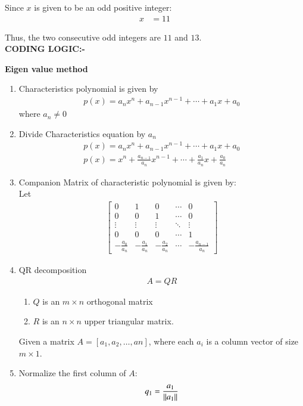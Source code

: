 \documentclass[journal]{IEEEtran}
\begin{document}
Since \( x \) is given to be an odd positive integer:
\begin{align}
x &= 11 \label{eq12}
\end{align}

Thus, the two consecutive odd integers are \( 11 \) and \( 13 \).\\



\textbf{CODING LOGIC:-}


\textbf{Eigen value method}
\begin{enumerate}
\item Characteristics polynomial is given by
\begin{align}
 p(x)=a_nx^n+a_{n-1}x^{n-1}+\cdots +a_1x+a_0   
\end{align}
where $a_n \neq 0$
\item Divide Characteristics equation by $a_n$
\begin{align}
    p(x)= a_nx^n+a_{n-1}x^{n-1}+\cdots +a_1x+a_0     \\
    p(x)=x^n+\frac{a_{n-1}}{a_n}x^{n-1}+\cdots +\frac{a_1}{a_n}x+\frac{a_0}{a_n}
\end{align}
\item Companion Matrix of characteristic polynomial is given by:\\
Let
\begin{align}
    \begin{bmatrix}
0 & 1 & 0 & \cdots & 0 \\
0 & 0 & 1 & \cdots & 0 \\
\vdots & \vdots & \vdots & \ddots & \vdots \\
0 & 0 & 0 & \cdots & 1 \\
-\frac{a_0}{a_n} & -\frac{a_1}{a_n} & -\frac{a_2}{a_n} & \cdots & -\frac{a_{n-1}}{a_n}
\end{bmatrix}
\end{align}
\item QR decomposition 
\begin{align}
A = QR
\end{align}
\begin{enumerate}
    \item $Q$ is an $ m \times n $ orthogonal matrix
    \item $R$ is an $n \times n$ upper triangular matrix.
\end{enumerate}
Given a matrix $ A = [a_1, a_2, \dots, an] $, where each $ a_i $ is a column vector of size $ m \times 1 $.

\item Normalize the first column of $A$:
\begin{align}
q_1 = \frac{a_1}{\left\lVert a_1\right\rVert}
\end{align}


\end{enumerate}
\end{document}
